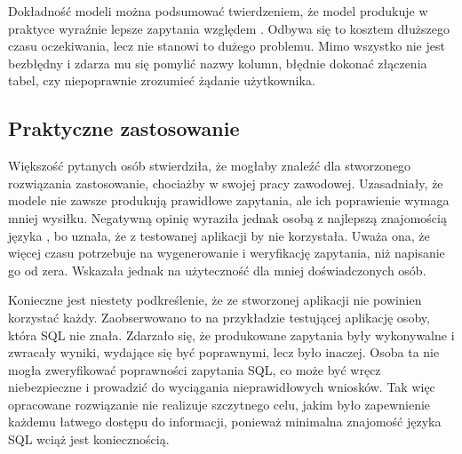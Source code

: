 Dokładność modeli można podsumować twierdzeniem, że model  produkuje w praktyce wyraźnie lepsze zapytania względem . Odbywa się to kosztem dłuższego czasu oczekiwania, lecz nie stanowi to dużego problemu. Mimo wszystko  nie jest bezbłędny i zdarza mu się pomylić nazwy kolumn, błędnie dokonać złączenia tabel, czy niepoprawnie zrozumieć żądanie użytkownika.

\subsection{Praktyczne zastosowanie}
Większość pytanych osób stwierdziła, że mogłaby znaleźć dla stworzonego rozwiązania zastosowanie, chociażby w swojej pracy zawodowej. Uzasadniały, że modele nie zawsze produkują prawidłowe zapytania, ale ich poprawienie wymaga mniej wysiłku. Negatywną opinię wyraziła jednak osobą z najlepszą znajomością języka , bo uznała, że z testowanej aplikacji by nie korzystała. Uważa ona, że więcej czasu potrzebuje na wygenerowanie i weryfikację zapytania, niż napisanie go od zera. Wskazała jednak na użyteczność dla mniej doświadczonych osób.

Konieczne jest niestety podkreślenie, że ze stworzonej aplikacji nie powinien korzystać każdy. Zaobserwowano to na przykładzie testującej aplikację osoby, która SQL nie znała. Zdarzało się, że produkowane zapytania były wykonywalne i zwracały wyniki, wydające się być poprawnymi, lecz było inaczej. Osoba ta nie mogła zweryfikować poprawności zapytania SQL, co może być wręcz niebezpieczne i prowadzić do wyciągania nieprawidłowych wniosków. Tak więc opracowane rozwiązanie nie realizuje szczytnego celu, jakim było zapewnienie każdemu łatwego dostępu do informacji, ponieważ minimalna znajomość języka SQL wciąż jest koniecznością.